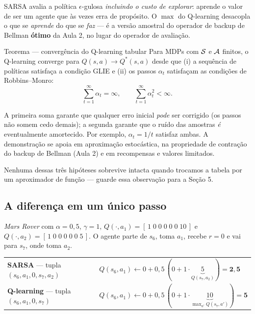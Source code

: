 \documentclass[11pt]{article}
\newcommand{\Qstar}{Q^{*}}
\begin{document}
\begin{ideiabox}
  SARSA avalia a política $\epsilon$-gulosa \emph{incluindo o custo de
  explorar}: aprende o valor de ser um agente que às vezes erra de propósito.
  O $\max$ do Q-learning desacopla o que se \emph{aprende} do que se
  \emph{faz} --- é a versão amostral do operador de backup de Bellman
  \textbf{ótimo} da Aula 2, no lugar do operador de avaliação.
\end{ideiabox}

\begin{teobox}{Teorema --- convergência do Q-learning tabular}
  Para MDPs com $\mathcal{S}$ e $\mathcal{A}$ finitos, o Q-learning converge para
  $Q(s,a) \to \Qstar(s,a)$ desde que (i) a sequência de políticas satisfaça a
  condição GLIE e (ii) os passos $\alpha_t$ satisfaçam as condições de
  Robbins--Monro:
  \[ \sum_{t=1}^{\infty} \alpha_t = \infty, \qquad \sum_{t=1}^{\infty} \alpha_t^2 < \infty. \]
\end{teobox}

A primeira soma garante que qualquer erro inicial \emph{pode} ser corrigido (os
passos não somem cedo demais); a segunda garante que o ruído das amostras
\emph{é} eventualmente amortecido. Por exemplo, $\alpha_t = 1/t$ satisfaz
ambas. A demonstração se apoia em aproximação estocástica, na propriedade de
contração do backup de Bellman (Aula 2) e em recompensas e valores limitados.

\begin{alertabox}
  Nenhuma dessas três hipóteses sobrevive intacta quando trocamos a tabela por
  um aproximador de função --- guarde essa observação para a Seção 5.
\end{alertabox}

\subsection{A diferença em um único passo}

\emph{Mars Rover} com $\alpha = 0{,}5$, $\gamma = 1$,
$Q(\cdot,a_1) = [\,1\;0\;0\;0\;0\;0\;10\,]$ e
$Q(\cdot,a_2) = [\,1\;0\;0\;0\;0\;0\;5\,]$. O agente parte de $s_6$, toma $a_1$,
recebe $r = 0$ e vai para $s_7$, onde toma $a_2$.

\begin{center}\small
\begin{tabular}{ll}
  \toprule
  \textbf{SARSA} --- tupla $(s_6, a_1, 0, s_7, a_2)$ &
  $Q(s_6,a_1) \leftarrow 0 + 0{,}5\,(0 + 1 \cdot \underbrace{5}_{Q(s_7,a_2)}) = \mathbf{2{,}5}$ \\
  \addlinespace[0.6ex]
  \textbf{Q-learning} --- tupla $(s_6, a_1, 0, s_7)$ &
  $Q(s_6,a_1) \leftarrow 0 + 0{,}5\,(0 + 1 \cdot \underbrace{10}_{\max_{a'} Q(s_7,a')}) = \mathbf{5}$ \\
  \bottomrule
\end{tabular}
\end{center}
\end{document}
